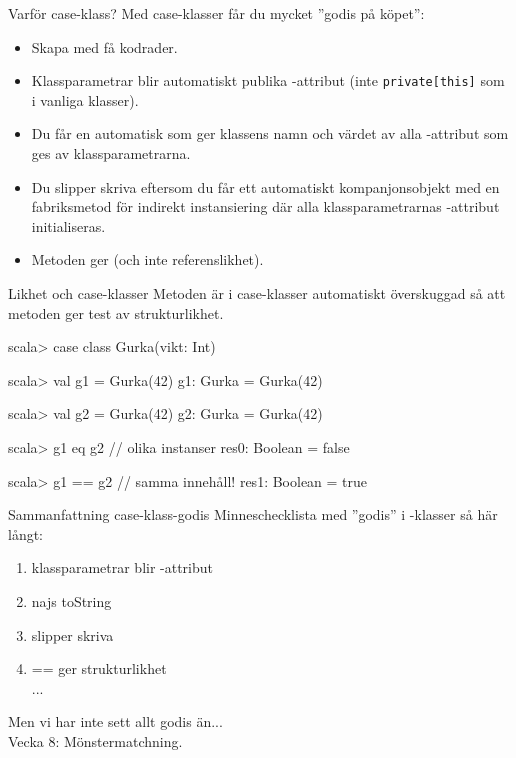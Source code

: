 
\ifkompendium\else





\begin{Slide}{Varför case-klass?}
Med case-klasser får du mycket ''godis på köpet'':
\begin{itemize}
\item Skapa  med få kodrader.
\item Klassparametrar blir automatiskt publika -attribut (inte \texttt{private[this]} som i vanliga klasser).
\item Du får en automatisk  som ger klassens namn och värdet av alla -attribut som ges av klassparametrarna.
\item Du slipper skriva  eftersom du får ett automatiskt kompanjonsobjekt med en fabriksmetod  för indirekt instansiering där alla klassparametrarnas -attribut initialiseras.
\item Metoden \code{==} ger  (och inte referenslikhet).
\end{itemize}
\end{Slide}



\begin{Slide}{Likhet och case-klasser}
Metoden  är i case-klasser automatiskt överskuggad så att metoden \code{==} ger test av strukturlikhet. 
\begin{REPL}
scala> case class Gurka(vikt: Int)

scala> val g1 = Gurka(42)
g1: Gurka = Gurka(42)

scala> val g2 = Gurka(42)
g2: Gurka = Gurka(42)

scala> g1 eq g2          // olika instanser
res0: Boolean = false

scala> g1 == g2          // samma innehåll!
res1: Boolean = true
\end{REPL}
\end{Slide}



\begin{Slide}{Sammanfattning case-klass-godis}
Minneschecklista med ''godis'' i -klasser så här långt:
\begin{enumerate}
\item klassparametrar blir -attribut 
\item najs toString
\item slipper skriva 
\item == ger strukturlikhet
\pause~\\...
\end{enumerate}

\vspace{3em}Men vi har inte sett allt godis än... \\Vecka 8: Mönstermatchning.
\end{Slide}



\fi